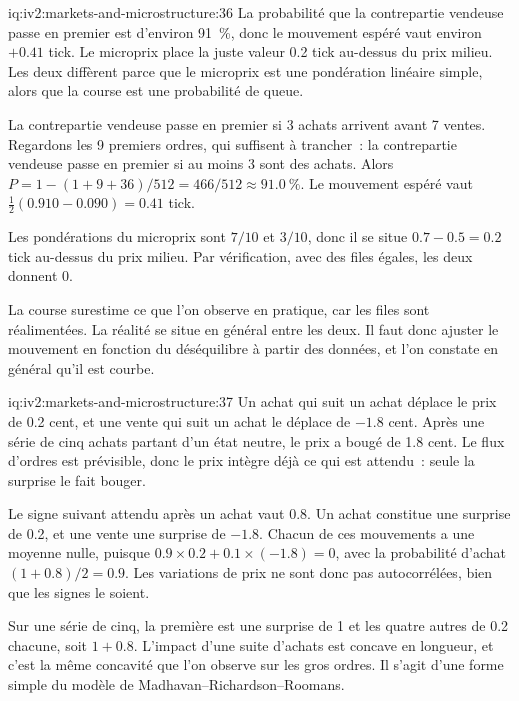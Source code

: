 \begin{solution}{iq:iv2:markets-and-microstructure:36}
La probabilité que la contrepartie vendeuse passe en premier est d'environ 91~\%, donc le mouvement espéré vaut environ $+0.41$ tick. Le microprix place la juste valeur 0.2 tick au-dessus du prix milieu. Les deux diffèrent parce que le microprix est une pondération linéaire simple, alors que la course est une probabilité de queue.

La contrepartie vendeuse passe en premier si 3 achats arrivent avant 7 ventes. Regardons les 9 premiers ordres, qui suffisent à trancher~: la contrepartie vendeuse passe en premier si au moins 3 sont des achats. Alors $P = 1 - (1 + 9 + 36)/512 = 466/512 \approx 91.0~\%$. Le mouvement espéré vaut $\tfrac12(0.910 - 0.090) = 0.41$ tick.

Les pondérations du microprix sont $7/10$ et $3/10$, donc il se situe $0.7 - 0.5 = 0.2$ tick au-dessus du prix milieu. Par vérification, avec des files égales, les deux donnent 0.

La course surestime ce que l'on observe en pratique, car les files sont réalimentées. La réalité se situe en général entre les deux. Il faut donc ajuster le mouvement en fonction du déséquilibre à partir des données, et l'on constate en général qu'il est courbe.

\end{solution}

\begin{solution}{iq:iv2:markets-and-microstructure:37}
Un achat qui suit un achat déplace le prix de 0.2 cent, et une vente qui suit un achat le déplace de $-1.8$ cent. Après une série de cinq achats partant d'un état neutre, le prix a bougé de 1.8 cent. Le flux d'ordres est prévisible, donc le prix intègre déjà ce qui est attendu~: seule la surprise le fait bouger.

Le signe suivant attendu après un achat vaut 0.8. Un achat constitue une surprise de 0.2, et une vente une surprise de $-1.8$. Chacun de ces mouvements a une moyenne nulle, puisque $0.9 \times 0.2 + 0.1 \times (-1.8) = 0$, avec la probabilité d'achat $(1 + 0.8)/2 = 0.9$. Les variations de prix ne sont donc pas autocorrélées, bien que les signes le soient.

Sur une série de cinq, la première est une surprise de 1 et les quatre autres de 0.2 chacune, soit $1 + 0.8$. L'impact d'une suite d'achats est concave en longueur, et c'est la même concavité que l'on observe sur les gros ordres. Il s'agit d'une forme simple du modèle de Madhavan--Richardson--Roomans.

\end{solution}

